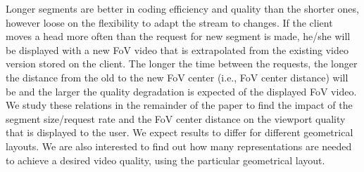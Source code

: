 Longer segments are better in coding efficiency and quality than the shorter ones, however loose on the flexibility to adapt the stream to changes. If the client moves a head more often than the request for new segment is made, he/she will be displayed with a new FoV video that is extrapolated from the existing video version stored on the client. The longer the time between the requests, the longer the distance from the old to the new FoV center (i.e., FoV center distance) will be and the larger the quality degradation is expected of the displayed FoV video. We study these relations in the remainder of the paper to find the impact of the segment size/request rate and the FoV center distance on the viewport quality that is displayed to the user. We expect results to differ for different geometrical layouts. We are also interested to find out how many representations are needed to achieve a desired video quality, using the particular geometrical layout.

